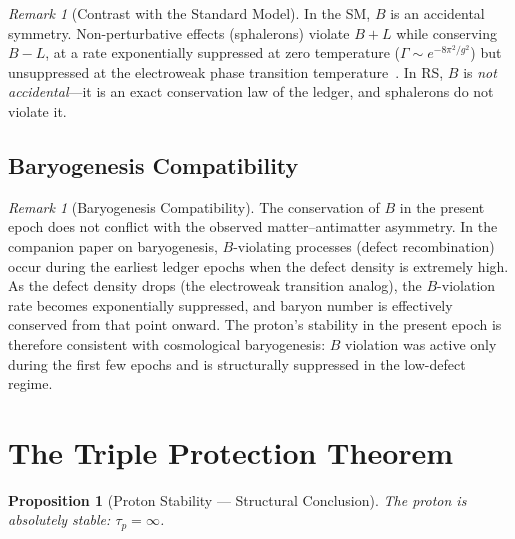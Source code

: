 \documentclass[12pt,a4paper]{article}
\newtheorem{proposition}[theorem]{Proposition}
\theoremstyle{definition}
\theoremstyle{remark}
\newtheorem{remark}[theorem]{Remark}
\begin{document}
\begin{remark}[Contrast with the Standard Model]
In the SM, $B$ is an accidental symmetry.  Non-perturbative
effects (sphalerons) violate $B + L$ while conserving
$B - L$, at a rate exponentially suppressed at zero
temperature ($\Gamma \sim e^{-8\pi^2/g^2}$) but
unsuppressed at the electroweak phase transition
temperature~\cite{tHooft1976,Kuzmin1985}.  In RS, $B$ is
\emph{not accidental}---it is an exact conservation law of
the ledger, and sphalerons do not violate it.
\end{remark}

\subsection{Baryogenesis Compatibility}

\begin{remark}[Baryogenesis Compatibility]
\label{rem:baryogenesis}
The conservation of $B$ in the present epoch does not
conflict with the observed matter--antimatter asymmetry.
In the companion paper on baryogenesis, $B$-violating
processes (defect recombination) occur during the earliest
ledger epochs when the defect density is extremely high.
As the defect density drops (the electroweak transition
analog), the $B$-violation rate becomes exponentially
suppressed, and baryon number is effectively conserved
from that point onward.  The proton's stability in the
present epoch is therefore consistent with cosmological
baryogenesis: $B$ violation was active only during the
first few epochs and is structurally suppressed in the
low-defect regime.
\end{remark}

\section{The Triple Protection Theorem}
\label{sec:triple}

\begin{proposition}[Proton Stability --- Structural Conclusion]
\label{thm:absolute}
The proton is absolutely stable: $\tau_p = \infty$.
\end{proposition}
\end{document}
